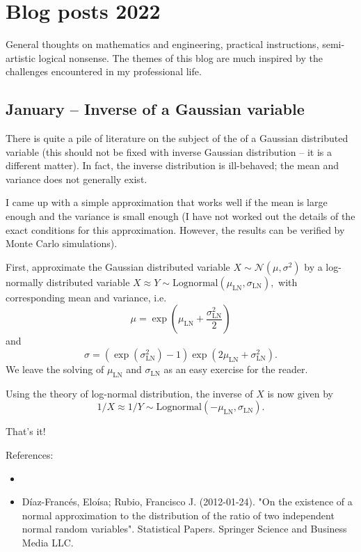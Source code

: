 \documentclass{article}
\begin{document}
\section{Blog posts 2022}
        General thoughts on mathematics and engineering, practical instructions, semi-artistic logical  nonsense. The themes of this blog are much inspired by the challenges encountered in my professional life. 

\subsection{January – Inverse of a Gaussian variable}

There is quite a pile of literature on the subject of the  of a Gaussian distributed variable (this should not be fixed with inverse Gaussian distribution – it is a different matter). In fact, the inverse distribution is ill-behaved; the mean and variance does not generally exist.

I came up with a simple approximation that works well if the mean is large enough and the variance is small enough (I have not worked out the details of the exact conditions for this approximation. However, the results can be verified by Monte Carlo simulations). 

First, approximate the Gaussian distributed variable $X \sim \mathcal{N}(\mu, \sigma^2)$ by a log-normally distributed variable $X \approx Y \sim \text{Lognormal}(\mu_{\text{LN}}, \sigma_{\text{LN}}),$ with corresponding mean and variance, i.e.
$$\mu = \exp\left( \mu_{\text{LN}} + \frac{\sigma_{\text{LN}}^2}{2} \right)$$ and
$$\sigma = (\exp( \sigma_{\text{LN}}^2) - 1)\exp(2 \mu_{\text{LN}} + \sigma_{\text{LN}}^2).$$ We leave the solving of $\mu_{\text{LN}}$ and $\sigma_{\text{LN}}$ as an easy exercise for the reader.


Using the theory of log-normal distribution, the inverse of $X$ is now given by
$$
1/X \approx 1/Y \sim \text{Lognormal}(-\mu_{\text{LN}}, \sigma_{\text{LN}}).
$$

That's it!



References:
\begin{itemize}
\item {}
\item  Díaz-Francés, Eloísa; Rubio, Francisco J. (2012-01-24). "On the existence of a normal approximation to the distribution of the ratio of two independent normal random variables". Statistical Papers. Springer Science and Business Media LLC.
\end{itemize}
\end{document}

